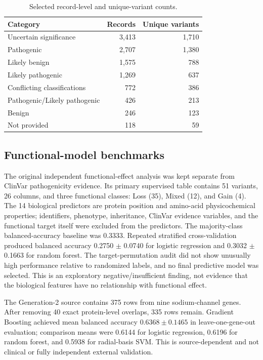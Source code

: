 \documentclass[12pt,a4paper]{article}
\begin{document}
\begin{table}[H]
\centering
\small
\caption{Selected record-level and unique-variant counts.}
\label{tab:clinical}
\begin{tabular}{lrr}
\toprule
Category & Records & Unique variants\\
\midrule
Uncertain significance & 3,413 & 1,710\\
Pathogenic & 2,707 & 1,380\\
Likely benign & 1,575 & 788\\
Likely pathogenic & 1,269 & 637\\
Conflicting classifications & 772 & 386\\
Pathogenic/Likely pathogenic & 426 & 213\\
Benign & 246 & 123\\
Not provided & 118 & 59\\
\bottomrule
\end{tabular}
\end{table}

\subsection{Functional-model benchmarks}
The original independent functional-effect analysis was kept separate from ClinVar pathogenicity evidence. Its primary supervised table contains 51 variants, 26 columns, and three functional classes: Loss (35), Mixed (12), and Gain (4). The 14 biological predictors are protein position and amino-acid physicochemical properties; identifiers, phenotype, inheritance, ClinVar evidence variables, and the functional target itself were excluded from the predictors. The majority-class balanced-accuracy baseline was 0.3333. Repeated stratified cross-validation produced balanced accuracy 0.2750 $\pm$ 0.0740 for logistic regression and 0.3032 $\pm$ 0.1663 for random forest. The target-permutation audit did not show unusually high performance relative to randomized labels, and no final predictive model was selected. This is an exploratory negative/insufficient finding, not evidence that the biological features have no relationship with functional effect.

The Generation-2 source contains 375 rows from nine sodium-channel genes. After removing 40 exact protein-level overlaps, 335 rows remain. Gradient Boosting achieved mean balanced accuracy $0.6368 \pm 0.1465$ in leave-one-gene-out evaluation; comparison means were 0.6144 for logistic regression, 0.6196 for random forest, and 0.5938 for radial-basis SVM. This is source-dependent and not clinical or fully independent external validation.
\end{document}
